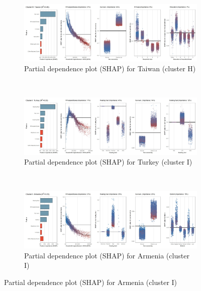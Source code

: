 \begin{figure}[ht!]\ContinuedFloat
    \centering
   \begin{subfigure}[b]{\textwidth}
         \centering
         \caption{Partial dependence plot (SHAP) for Taiwan (cluster H)}
         \label{fig:5b_TWN}
         \includegraphics[width=\textwidth]{Figure 5b/Figure_5b_TWN}         
     \end{subfigure}
    \\
    \vspace{0.5cm}
   \begin{subfigure}[b]{\textwidth}
         \centering
         \caption{Partial dependence plot (SHAP) for Turkey (cluster I)}
         \label{fig:5b_TUR}
         \includegraphics[width=\textwidth]{Figure 5b/Figure_5b_TUR}         
     \end{subfigure}
    \\
    \vspace{0.5cm}
   \begin{subfigure}[b]{\textwidth}
         \centering
         \caption{Partial dependence plot (SHAP) for Armenia (cluster I)}
         \label{fig:5b_ARM}
         \includegraphics[width=\textwidth]{Figure 5b/Figure_5b_ARM}

\end{subfigure}
\end{figure}
